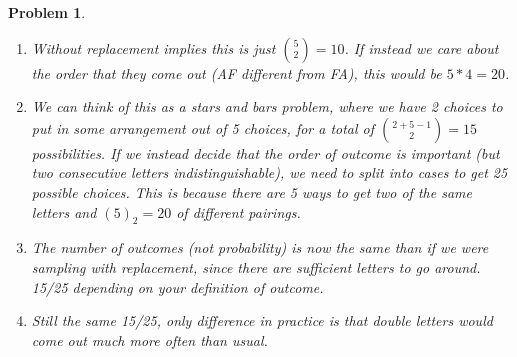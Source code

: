 \documentclass{article}
\theoremstyle{mystyle}
\newtheorem{prob}{Problem}
\begin{document}
\begin{prob}
	\begin{enumerate}
		\item Without replacement implies this is just ${5 \choose 2}=10$. If instead we care about the order that they come out (AF different from FA), this would be $5*4=20$.

		\item We can think of this as a stars and bars problem, where we have 2 choices to put in some arrangement out of 5 choices, for a total of ${2+5-1 \choose 2}= 15$ possibilities.
		If we instead decide that the order of outcome is important (but two consecutive letters indistinguishable), we need to split into cases to get 25 possible choices.
		This is because there are 5 ways to get two of the same letters and $(5)_2=20$ of different pairings.

		\item The number of outcomes (not probability) is now the same than if we were sampling with replacement, since there are sufficient letters to go around. 15/25 depending on your definition of outcome.

		\item Still the same 15/25, only difference in practice is that double letters would come out much more often than usual.
	\end{enumerate}
\end{prob}
\end{document}
